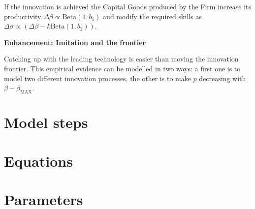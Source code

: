 \documentclass[a4paper, headings=standardclasses]{scrartcl}
\newenvironment{enh}[1][]{\begin{framed}\noindent\textbf{Enhancement: #1}\par}{\end{framed}}
\begin{document}
If the innovation is achieved the Capital Goods produced by the Firm increase its productivity $\Delta \beta \propto \text{Beta}(1, b_1)$ and modify the required skills as $\Delta \sigma \propto (\Delta \beta - k \text{Beta}(1, b_2))$.

\begin{enh}[Imitation and the frontier]
	Catching up with the leading technology is easier than moving the innovation frontier. This empirical evidence can be modelled in two ways: a first one is to model two different innovation processes, the other is to make $p$ decreasing with $\beta - \beta_\text{MAX}$.
\end{enh}

\section{Model steps}
\begin{steps}
	\item
\end{steps}

\section{Equations}

\section{Parameters}

\printbibliography
\end{document}
